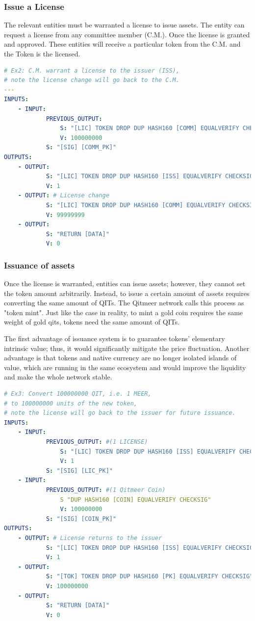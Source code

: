 \documentclass[a4paper,11pt]{article}
\begin{document}
\subsubsection{Issue a License}

The relevant entities must be warranted a license to issue assets. The entity can request a license from any committee member (C.M.). Once the license is granted and approved. These entities will receive a particular token from the C.M. and the Token is the licensed.

\lstset{basicstyle=\tiny,style=myListStyle}
\begin{lstlisting}[language=yaml, numbers=none,basicstyle=\footnotesize]
# Ex2: C.M. warrant a license to the issuer (ISS),
# note the license change will go back to the C.M.
---
INPUTS:
	- INPUT:
			PREVIOUS_OUTPUT:
				S: "[LIC] TOKEN DROP DUP HASH160 [COMM] EQUALVERIFY CHECKSIG"
				V: 100000000
			S: "[SIG] [COMM_PK]"
OUTPUTS:
	- OUTPUT:
			S: "[LIC] TOKEN DROP DUP HASH160 [ISS] EQUALVERIFY CHECKSIG"
			V: 1
	- OUTPUT: # License change
			S: "[LIC] TOKEN DROP DUP HASH160 [COMM] EQUALVERIFY CHECKSIG"
			V: 99999999
	- OUTPUT:
			S: "RETURN [DATA]"
			V: 0
\end{lstlisting}

\subsubsection{Issuance of assets}
Once the license is warranted, entities can issue assets; however, they cannot set the token amount arbitrarily. Instead, to issue a certain amount of assets requires converting the same amount of QITs. The Qitmeer network calls this process as "token mint". Just like the case in reality, to mint a gold coin requires the same weight of gold qits, tokens need the same amount of QITs.

The first advantage of issuance system is to guarantee tokens’ elementary intrinsic value; thus, it would significantly mitigate the price fluctuation. Another advantage is that tokens and native currency are no longer isolated islands of value, which are running in the same ecosystem and would improve the liquidity and make the whole network stable.

\lstset{basicstyle=\tiny,style=myListStyle}
\begin{lstlisting}[language=yaml, numbers=none,basicstyle=\footnotesize]
# Ex3: Convert 100000000 QIT, i.e. 1 MEER,
# to 100000000 units of the new token,
# note the license will go back to the issuer for future issuance.
INPUTS:
	- INPUT:
			PREVIOUS_OUTPUT: #(1 LICENSE)
				S: "[LIC] TOKEN DROP DUP HASH160 [ISS] EQUALVERIFY CHECKSIG"
				V: 1
			S: "[SIG] [LIC_PK]"
	- INPUT:
			PREVIOUS_OUTPUT: #(1 Qitmeer Coin)
				S "DUP HASH160 [COIN] EQUALVERIFY CHECKSIG"
				V: 100000000
			S: "[SIG] [COIN_PK]"
OUTPUTS:
	- OUTPUT: # License returns to the issuer
			S: "[LIC] TOKEN DROP DUP HASH160 [ISS] EQUALVERIFY CHECKSIG"
			V: 1
	- OUTPUT:
			S: "[TOK] TOKEN DROP DUP HASH160 [PK] EQUALVERIFY CHECKSIG"
			V: 100000000
	- OUTPUT:
			S: "RETURN [DATA]"
			V: 0
\end{lstlisting}
\end{document}
